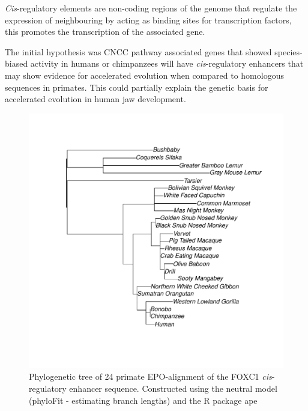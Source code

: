 \documentclass{article}[12pt]
\begin{document}
\emph{Cis}-regulatory elements are non-coding regions of the genome that regulate the expression of neighbouring by acting as binding sites for transcription factors, this promotes the transcription of the associated gene. 

The initial hypothesis was CNCC pathway associated genes that showed species-biased activity in humans or chimpanzees will have \emph{cis}-regulatory enhancers that may show evidence for accelerated evolution when compared to homologous sequences in primates. This could partially explain the genetic basis for accelerated evolution in human jaw development. 


\begin{figure}[H]
\centering
\includegraphics[width=12cm]{neutral_tree.pdf}
\caption{Phylogenetic tree of 24 primate \Gls{EPO}-alignment of the FOXC1 \emph{cis}-regulatory enhancer sequence. Constructed using the neutral model (phyloFit - estimating branch lengths) and the R package ape \parencite{Ape}}
\label{fig1}
\end{figure}
\end{document}
